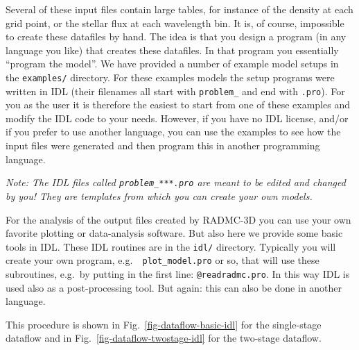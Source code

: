 \documentclass{report}
\begin{document}
Several of these input files contain large tables, for instance of the
density at each grid point, or the stellar flux at each wavelength bin. It
is, of course, impossible to create these datafiles by hand. The idea is
that you design a program (in any language you like) that creates these
datafiles. In that program you essentially ``program the model''. We have
provided a number of example model setups in the {\small\tt examples/}
directory. For these examples models the setup programs were written in IDL
(their filenames all start with {\small\tt problem\_} and end with
{\small\tt .pro}). For you as the user it is therefore the easiest to start
from one of these examples and modify the IDL code to your needs. However,
if you have no IDL license, and/or if you prefer to use another language,
you can use the examples to see how the input files were generated and then
program this in another programming language.

{\em Note: The IDL files called {\small\tt problem\_***.pro} are meant to
be edited and changed by you! They are templates from which you can 
create your own models.} 

For the analysis of the output files created by RADMC-3D you can use your
own favorite plotting or data-analysis software. But also here we provide
some basic tools in IDL. These IDL routines are in the {\small\tt idl/}
directory. Typically you will create your own program, e.g.\ {\small\tt
  plot\_model.pro} or so, that will use these subroutines, e.g.\ by putting
in the first line: {\small\tt @readradmc.pro}. In this way IDL is used 
also as a post-processing tool. But again: this can also be done in another
language.

This procedure is shown in Fig.~\ref{fig-dataflow-basic-idl} for the
single-stage dataflow and in Fig.~\ref{fig-dataflow-twostage-idl} for the
two-stage dataflow.
\end{document}
